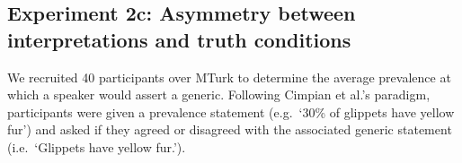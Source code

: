 \documentclass[10pt,letterpaper]{article}
\begin{document}
\subsection{Experiment 2c: Asymmetry between interpretations and truth conditions}
%
%
%
We recruited 40 participants over MTurk to determine the average prevalence at which a speaker would assert a generic.  
Following Cimpian et al.'s paradigm, participants were given a prevalence statement (e.g.~`30\% of glippets have yellow fur') and asked if they agreed or disagreed with the associated generic statement (i.e.~`Glippets have yellow fur.').
\end{document}
